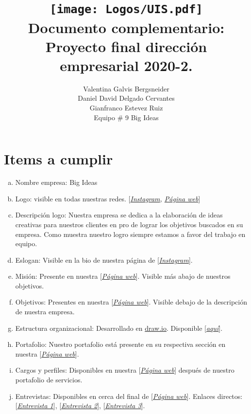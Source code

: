 \documentclass[10pt]{article}
\title{
    \vspace{-2cm}
    \texttt{[image: Logos/UIS.pdf]} \\
    Documento complementario: \\ Proyecto final dirección empresarial 2020-2.}
\author{Valentina Galvis Bergsneider \\ 
    Daniel David Delgado Cervantes \\ 
    Gianfranco Estevez Ruiz \\ 
    Equipo \# 9
    Big Ideas
}
\begin{document}
    \maketitle

\section{Items a cumplir}

\begin{enumerate}[a)]
    \item Nombre empresa: Big Ideas
    \item Logo: visible en todas nuestras redes. [\textit{\href{https://www.instagram.com/bigideasde1/}{Instagram}, \href{https://vvisgal2.wixsite.com/bigideas/}{Página web}}]
    \item Descripción logo: Nuestra empresa se dedica a la elaboración de ideas creativas para nuestros clientes en pro de lograr los objetivos buscados en su empresa. Como muestra nuestro logro siempre estamos a favor del trabajo en equipo.
    \item Eslogan: Visible en la bio de nuestra página de [\textit{\href{https://www.instagram.com/bigideasde1/}{Instagram}}]. 
    \item Misión: Presente en nuestra [\textit{\href{https://vvisgal2.wixsite.com/bigideas/}{Página web}}]. Visible más abajo de nuestros objetivos.
    \item Objetivos: Presentes en nuestra [\textit{\href{https://vvisgal2.wixsite.com/bigideas/}{Página web}}]. Visible debajo de la descripción de nuestra empresa.
    \item Estructura organizacional: Desarrollado en \url{draw.io}. Disponible [\textit{\href{https://drive.google.com/file/d/1GQhwDbZ2K-pRW-nCA6m8geqAIBCA47fB/view?usp=sharing}{aquí}}].
    \item Portafolio: Nuestro portafolio está presente en su respectiva sección en nuestra [\textit{\href{https://vvisgal2.wixsite.com/bigideas/}{Página web}}]. 
    \item Cargos y perfiles: Disponibles en nuestra [\textit{\href{https://vvisgal2.wixsite.com/bigideas/}{Página web}}] después de nuestro portafolio de servicios.
    \item Entrevistas: Disponibles en cerca del final de [\textit{\href{https://vvisgal2.wixsite.com/bigideas/}{Página web}}]. Enlaces directos: [\textit{\href{https://vvisgal2.wixsite.com/bigideas/?wix-vod-video-id=aa3ba8c458cb47f881184501249f95c5&wix-vod-comp-id=comp-klimkz5b}{Entrevista 1}}], [\textit{\href{https://vvisgal2.wixsite.com/bigideas/?wix-vod-video-id=1f5426ba028f469e897903d3fca578a6&wix-vod-comp-id=comp-klimkz5b}{Entrevista 2}}], [\textit{\href{https://vvisgal2.wixsite.com/bigideas/?wix-vod-video-id=f705a2bd32fa4610a66c9a06e5741391&wix-vod-comp-id=comp-klimkz5b}{Entrevista 3}}].

\end{enumerate}
\end{document}
